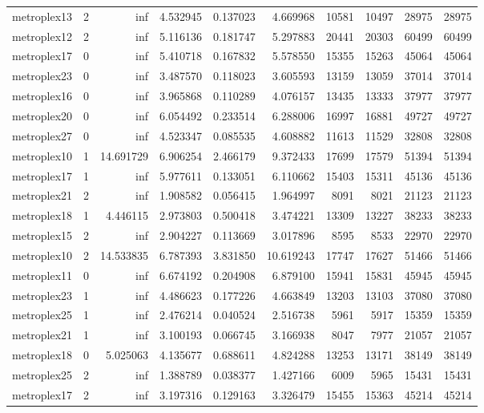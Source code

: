 \begin{longtable}{|l|r|r|r|r|r|r|r|r|r|}
metroplex13 & 2 & inf & 4.532945 & 0.137023 & 4.669968 & 10581 & 10497 & 28975 & 28975 \\
metroplex12 & 2 & inf & 5.116136 & 0.181747 & 5.297883 & 20441 & 20303 & 60499 & 60499 \\
metroplex17 & 0 & inf & 5.410718 & 0.167832 & 5.578550 & 15355 & 15263 & 45064 & 45064 \\
metroplex23 & 0 & inf & 3.487570 & 0.118023 & 3.605593 & 13159 & 13059 & 37014 & 37014 \\
metroplex16 & 0 & inf & 3.965868 & 0.110289 & 4.076157 & 13435 & 13333 & 37977 & 37977 \\
metroplex20 & 0 & inf & 6.054492 & 0.233514 & 6.288006 & 16997 & 16881 & 49727 & 49727 \\
metroplex27 & 0 & inf & 4.523347 & 0.085535 & 4.608882 & 11613 & 11529 & 32808 & 32808 \\
metroplex10 & 1 & 14.691729 & 6.906254 & 2.466179 & 9.372433 & 17699 & 17579 & 51394 & 51394 \\
metroplex17 & 1 & inf & 5.977611 & 0.133051 & 6.110662 & 15403 & 15311 & 45136 & 45136 \\
metroplex21 & 2 & inf & 1.908582 & 0.056415 & 1.964997 & 8091 & 8021 & 21123 & 21123 \\
metroplex18 & 1 & 4.446115 & 2.973803 & 0.500418 & 3.474221 & 13309 & 13227 & 38233 & 38233 \\
metroplex15 & 2 & inf & 2.904227 & 0.113669 & 3.017896 & 8595 & 8533 & 22970 & 22970 \\
metroplex10 & 2 & 14.533835 & 6.787393 & 3.831850 & 10.619243 & 17747 & 17627 & 51466 & 51466 \\
metroplex11 & 0 & inf & 6.674192 & 0.204908 & 6.879100 & 15941 & 15831 & 45945 & 45945 \\
metroplex23 & 1 & inf & 4.486623 & 0.177226 & 4.663849 & 13203 & 13103 & 37080 & 37080 \\
metroplex25 & 1 & inf & 2.476214 & 0.040524 & 2.516738 & 5961 & 5917 & 15359 & 15359 \\
metroplex21 & 1 & inf & 3.100193 & 0.066745 & 3.166938 & 8047 & 7977 & 21057 & 21057 \\
metroplex18 & 0 & 5.025063 & 4.135677 & 0.688611 & 4.824288 & 13253 & 13171 & 38149 & 38149 \\
metroplex25 & 2 & inf & 1.388789 & 0.038377 & 1.427166 & 6009 & 5965 & 15431 & 15431 \\
metroplex17 & 2 & inf & 3.197316 & 0.129163 & 3.326479 & 15455 & 15363 & 45214 & 45214 \\

\end{longtable}
